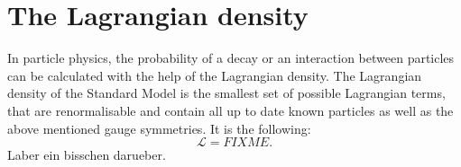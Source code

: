 \renewcommand{\arraystretch}{1.4}
\begin{table}[!h]
\centering
\caption{All particles contained in the Standard Model and their transformation properties under $SU(3)_c  \times SU(2)_L \times SU(1)_Y$.}
\label{tab:ParticleContent_SM}
\end{table}  


\section{The Lagrangian density}
In particle physics, the probability of a decay or an interaction between particles can be calculated with the help of the Lagrangian density.
The Lagrangian density of the Standard Model is the smallest set of possible Lagrangian terms, that are renormalisable and contain all up to date known particles as well as the above mentioned gauge symmetries.
It is the following:
\begin{equation}
\mathcal{L} = FIXME.
\end{equation}
Laber ein bisschen darueber.

